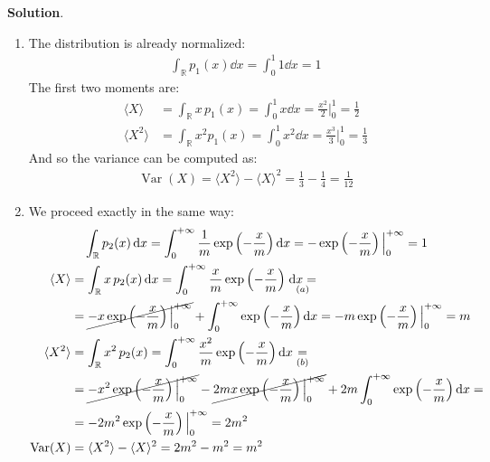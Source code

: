\documentclass[../template.tex]{subfiles}
\begin{document}
\begin{exo}
    \textbf{Solution}. 
    \begin{enumerate}
        \item The distribution is already normalized:
        \begin{align*}
            \int_\mathbb{R} p_1(x) \dd{x} = \int_0^1 1 \dd{x} = 1
        \end{align*}
        The first two moments are:
        \begin{align*}
            \langle X \rangle &= \int_{\mathbb{R}} x\, p_1(x) = \int_0^1 x \dd{x} = \frac{x^2}{2} \Big|_0^1 = \frac{1}{2}  \\
            \langle X^2 \rangle &= \int_{\mathbb{R}} x^2 p_1(x) = \int_0^1 x^2 \dd{x} = \frac{x^3}{3} \Big|_0^1 = \frac{1}{3} 
        \end{align*}
        And so the variance can be computed as:
        \begin{align*}
            \operatorname{Var}(X) = \langle X^2 \rangle - \langle X \rangle^2 = \frac{1}{3} - \frac{1}{4} = \frac{1}{12}   
        \end{align*}
        \item We proceed exactly in the same way:
        \begin{align*}
            \int_{\mathbb{R}} p_2(x) \dd{x} = \int_0^{+\infty} \frac{1}{m}\exp\left(-\frac{x}{m} \right) \dd{x}= - \exp\left(-\frac{x}{m} \right) \Big|_0^{+\infty} = 1 \span\\
            \langle X \rangle &= \int_\mathbb{R} x\,p_2(x) \dd{x}= \int_0^{+\infty} \frac{x}{m} \exp\left(-\frac{x}{m} \right) \underset{(a)}{\dd{x}=} \\
            &=\cancel{ -x \exp\left(-\frac{x}{m} \right) \Big|_0^{+\infty} }+ \int_0^{+\infty} \exp\left(-\frac{x}{m} \right) \dd{x}= -m \exp\left(-\frac{x}{m} \right)\Big|_0^{+\infty} = m\\
            \langle X^2 \rangle &= \int_{\mathbb{R}} x^2\,p_2(x) = \int_0^{+\infty} \frac{x^2}{m} \exp\left(-\frac{x}{m} \right)  \dd{x} \underset{(b)}{=} \\
            &= \cancel{-x^2 \exp\left(-\frac{x}{m} \right) \Big|_0^{+\infty}} -\cancel{2m x \exp\left(-\frac{x}{m} \right)\Big|_0^{+\infty} }+2m \int_0^{+\infty} \exp\left(-\frac{x}{m} \right)\dd{x} =\\
            &=-2m^2 \exp\left(-\frac{x}{m} \right)\Big|_0^{+\infty} = 2m^2\\
            \operatorname{Var}(X) &= \langle X^2 \rangle - \langle X \rangle^2 = 2m^2 - m^2 = m^2
        \end{align*}

\end{enumerate}
\end{exo}
\end{document}
